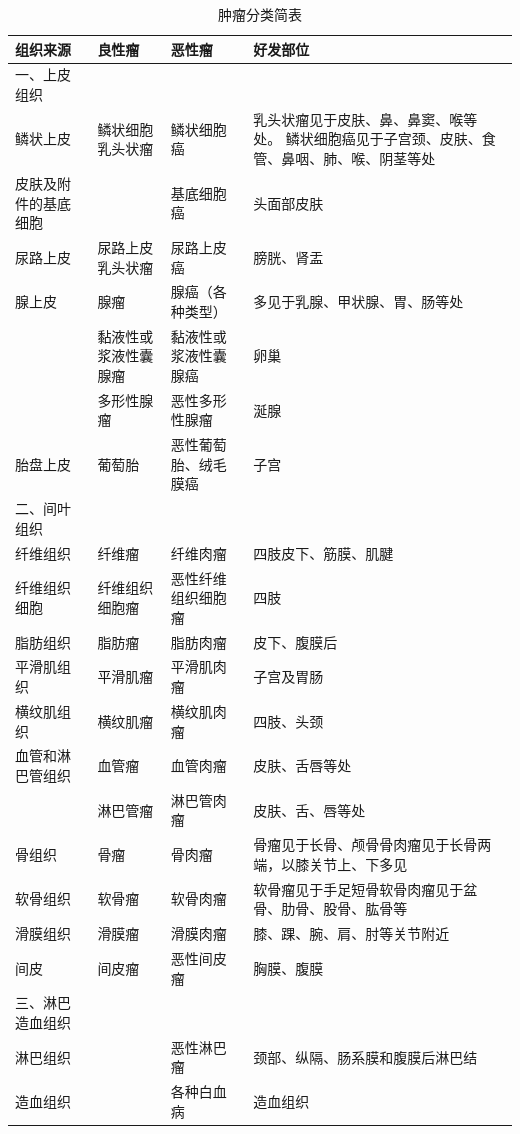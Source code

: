 \begin{longtable}[]{lm{3cm}m{3cm}m{3cm}}
    \caption{肿瘤分类简表}
    \label{tab5-1}\\
    \toprule
    组织来源 & 良性瘤 & 恶性瘤 & 好发部位
    \\
\midrule
一、上皮组织 & & &
\\\hline
\quad 鳞状上皮&
鳞状细胞乳头状瘤& 鳞状细胞癌&
乳头状瘤见于皮肤、鼻、鼻窦、喉等处。
鳞状细胞癌见于子宫颈、皮肤、食管、鼻咽、肺、喉、阴茎等处
\\\hline
\quad 皮肤及附件的基底细胞& &基底细胞癌&头面部皮肤
\\\hline
\quad 尿路上皮&尿路上皮乳头状瘤&尿路上皮癌&膀胱、肾盂
\\\hline
\quad 腺上皮&腺瘤&腺癌（各种类型）&多见于乳腺、甲状腺、胃、肠等处
\\\hline
&黏液性或浆液性囊腺瘤&黏液性或浆液性囊腺癌&卵巢
\\\hline
&多形性腺瘤&恶性多形性腺瘤&涎腺
\\\hline
\quad 胎盘上皮&葡萄胎&恶性葡萄胎、绒毛膜癌&子宫
\\\hline
二、间叶组织&&&
\\\hline
\quad 纤维组织&纤维瘤&纤维肉瘤&四肢皮下、筋膜、肌腱
\\\hline
\quad 纤维组织细胞&纤维组织细胞瘤&恶性纤维组织细胞瘤&四肢
\\\hline
\quad 脂肪组织&脂肪瘤&脂肪肉瘤&皮下、腹膜后
\\\hline
\quad 平滑肌组织&平滑肌瘤&平滑肌肉瘤&子宫及胃肠
\\\hline
\quad 横纹肌组织&横纹肌瘤&横纹肌肉瘤&四肢、头颈
\\\hline
\quad 血管和淋巴管组织&血管瘤&血管肉瘤&皮肤、舌唇等处
\\\hline
&淋巴管瘤&淋巴管肉瘤&皮肤、舌、唇等处
\\\hline
\quad 骨组织&骨瘤&骨肉瘤&骨瘤见于长骨、颅骨骨肉瘤见于长骨两端，以膝关节上、下多见
\\\hline
\quad 软骨组织&软骨瘤&软骨肉瘤&软骨瘤见于手足短骨软骨肉瘤见于盆骨、肋骨、股骨、肱骨等
\\\hline
\quad 滑膜组织&滑膜瘤&滑膜肉瘤&膝、踝、腕、肩、肘等关节附近
\\\hline
\quad 间皮&间皮瘤&恶性间皮瘤&胸膜、腹膜
\\\hline
三、淋巴造血组织&&&
\\\hline
\quad 淋巴组织&&恶性淋巴瘤&颈部、纵隔、肠系膜和腹膜后淋巴结
\\\hline
\quad 造血组织&&各种白血病&造血组织
\\\hline

\end{longtable}
